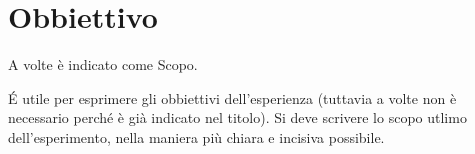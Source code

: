 \section{Obbiettivo}
A volte è indicato come Scopo.

\'E utile per esprimere gli obbiettivi dell'esperienza (tuttavia a volte non è necessario perché è già indicato nel titolo). Si deve scrivere lo scopo utlimo dell'esperimento, nella maniera più chiara e incisiva possibile.

